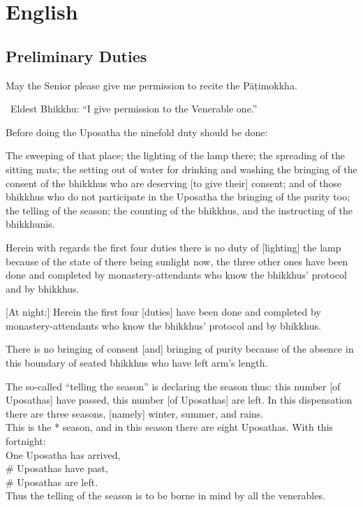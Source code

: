 

\chapter{English}

\clearpage

\section{Preliminary Duties}
\label{preliminary-duties}

\begin{center}
  May the Senior please give me permission to recite the Pāṭimokkha.
\end{center}

\begin{center}
  \anglebracketleft\ \hspace{-0.5mm}Eldest Bhikkhu: ``I give permission to the Venerable one.'' \hspace{-0.5mm}\anglebracketright\
\end{center}

Before doing the Uposatha the ninefold duty should be done:

The sweeping of that place; the lighting of the lamp there; the spreading of the sitting mats; the setting out of water for drinking and washing the bringing of the consent of the bhikkhus who are deserving [to give their] consent; and of those bhikkhus who do not participate in the Uposatha the bringing of the purity too; the telling of the season; the counting of the bhikkhus, and the instructing of the bhikkhunīs.

Herein with regards the first four duties there is no duty of [lighting] the lamp because of the state of there being sunlight now, the three other ones have been done and completed by monastery-attendants who know the bhikkhus' protocol and by bhikkhus.

[At night:] Herein the first four [duties] have been done and completed by monastery-attendants who know the bhikkhus’ protocol and by bhikkhus.

There is no bringing of consent [and] bringing of purity because of the absence in this boundary of seated bhikkhus who have left arm's length.

The so-called ``telling the season'' is declaring the season thus: this number [of Uposathas] have passed, this number [of Uposathas] are left. In this dispensation there are three seasons, [namely] winter, summer, and rains.\\
This is the * season, and in this season there are eight Uposathas. With this fortnight:\\
One Uposatha has arrived,\\
\# Uposathas have past,\\
\# Uposathas are left.\\
Thus the telling of the season is to be borne in mind by all the venerables.

